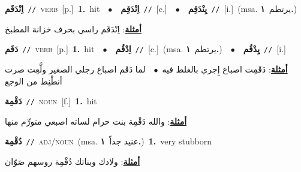 \documentclass[10pt,a4paper,twoside]{article} %
\begin{document}
\begin{multicols}{2}
{\setlength\topsep{0pt}\textbf{\foreignlanguage{arabic}{اِنْدَقَم}}\ {\color{gray}\texttt{//}\color{black}}\ \textsc{verb}\ [p.]\ \textbf{1.}~hit\ \ $\bullet$\ \ \setlength\topsep{0pt}\textbf{\foreignlanguage{arabic}{اِنْدَقِم}}\ {\color{gray}\texttt{//}\color{black}}\ [c.]\ \ $\bullet$\ \ \setlength\topsep{0pt}\textbf{\foreignlanguage{arabic}{يِنْدَقِم}}\ {\color{gray}\texttt{//}\color{black}}\ [i.]\ \color{gray}(msa. \foreignlanguage{arabic}{يرتطم}~\foreignlanguage{arabic}{\textbf{١.}})\color{black}\  \begin{flushright}\color{gray}\foreignlanguage{arabic}{\textbf{\underline{\foreignlanguage{arabic}{أمثلة}}}: اِنْدَقَم راسي بحرف خزانة المطبخ}\end{flushright}\color{black}} \vspace{2mm}

{\setlength\topsep{0pt}\textbf{\foreignlanguage{arabic}{دَقَم}}\ {\color{gray}\texttt{//}\color{black}}\ \textsc{verb}\ [p.]\ \textbf{1.}~hit\ \ $\bullet$\ \ \setlength\topsep{0pt}\textbf{\foreignlanguage{arabic}{اِدْقُم}}\ {\color{gray}\texttt{//}\color{black}}\ [c.]\ \color{gray}(msa. \foreignlanguage{arabic}{يرتطم}~\foreignlanguage{arabic}{\textbf{١.}})\color{black}\ \ $\bullet$\ \ \setlength\topsep{0pt}\textbf{\foreignlanguage{arabic}{يِدْقُم}}\ {\color{gray}\texttt{//}\color{black}}\ [i.]\  \begin{flushright}\color{gray}\foreignlanguage{arabic}{\textbf{\underline{\foreignlanguage{arabic}{أمثلة}}}: دَقَمِت اصباع إِجري بالغلط فيه\ $\bullet$\ \  لما دَقَم اصباع رجلي الصغير ولَّعِت صرت أنطْنِط من الوجع}\end{flushright}\color{black}} \vspace{2mm}

{\setlength\topsep{0pt}\textbf{\foreignlanguage{arabic}{دَقْمِة}}\ {\color{gray}\texttt{//}\color{black}}\ \textsc{noun}\ [f.]\ \textbf{1.}~hit\  \begin{flushright}\color{gray}\foreignlanguage{arabic}{\textbf{\underline{\foreignlanguage{arabic}{أمثلة}}}: والله دَقْمِة بنت حرام لساته اصبعي متورِّم منها}\end{flushright}\color{black}} \vspace{2mm}

{\setlength\topsep{0pt}\textbf{\foreignlanguage{arabic}{دُقْمِة}}\ {\color{gray}\texttt{//}\color{black}}\ \textsc{adj/noun}\ \color{gray}(msa. \foreignlanguage{arabic}{عنيد جداً}~\foreignlanguage{arabic}{\textbf{١.}})\color{black}\ \textbf{1.}~very stubborn\  \begin{flushright}\color{gray}\foreignlanguage{arabic}{\textbf{\underline{\foreignlanguage{arabic}{أمثلة}}}: ولادك وبناتك دُقْمِة روسهم صَوّان}\end{flushright}\color{black}} \vspace{2mm}


\end{multicols}
\end{document}
